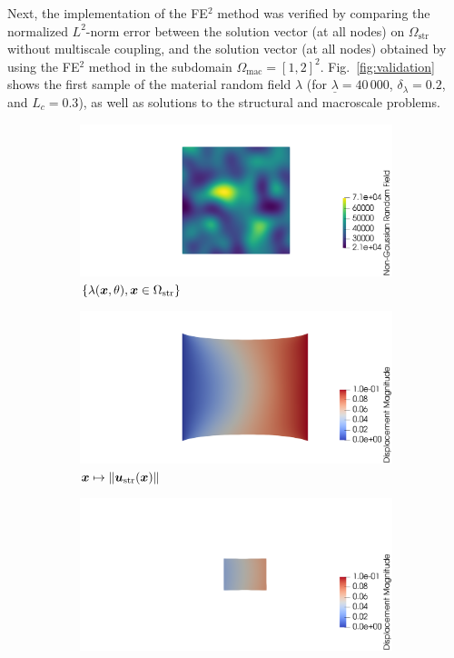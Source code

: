 Next, the implementation of the FE$^2$ method was verified by comparing the normalized $L^2$-norm error between the solution vector (at all nodes) on $\Omega_\text{str}$ without multiscale coupling, and the solution vector (at all nodes) obtained by using the FE$^2$ method in the subdomain $\Omega_\text{mac} = [1, 2]^2$. Fig.~\ref{fig:validation} shows the first sample of the material random field $\lambda$ (for $\underline{\lambda} = 40\,000$, $\delta_{\lambda} = 0.2$, and $L_c = 0.3$), as well as solutions to the structural and macroscale problems. 
\begin{figure}[!ht]
    \begin{subfigure}[b]{0.33\textwidth}
        \includegraphics[trim = {12cm 0cm 0cm 0cm}, clip, width=\textwidth]{Pictures/lambda_11.png}
        \caption{$\{\lambda({\boldsymbol{x}}, \theta), {\boldsymbol{x}} \in \Omega_{\text{str}}\}$}
    \end{subfigure}
    \begin{subfigure}[b]{0.33\textwidth}
        \includegraphics[trim = {12cm 0cm 0cm 0cm}, clip, width=\textwidth]{Pictures/omega_str_11.png}
        \caption{${\boldsymbol{x}} \mapsto \lVert {\boldsymbol{u}}_\text{str}({\boldsymbol{x}})\rVert$}
    \end{subfigure}
    \begin{subfigure}[b]{0.33\textwidth}
        \includegraphics[trim = {12cm 0cm 0cm 0cm}, clip, width=\textwidth]{Pictures/omega_mac_11.png}

\end{subfigure}
\end{figure}
